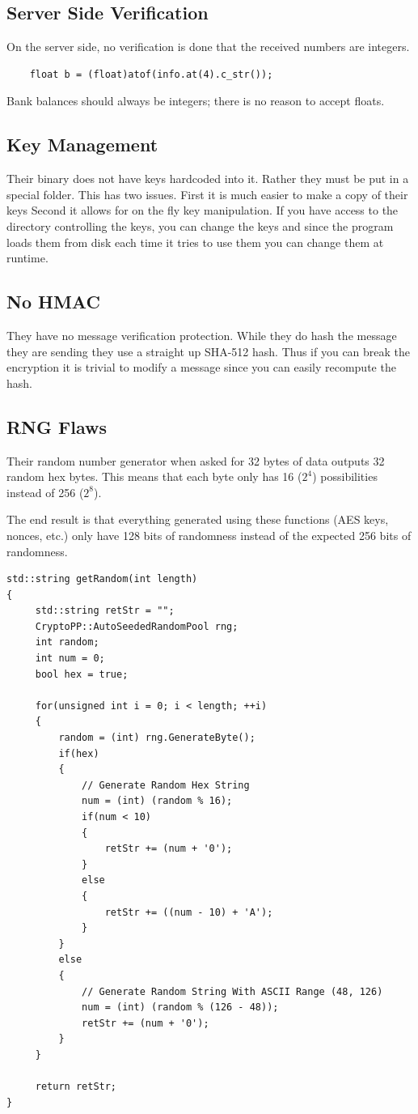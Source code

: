 \documentclass{article}
\begin{document}
\subsection{Server Side Verification}
On the server side, no verification is done that the received numbers are integers.
\begin{lstlisting}
    float b = (float)atof(info.at(4).c_str());
\end{lstlisting}
Bank balances should always be integers; there is no reason to accept floats.

\subsection{Key Management}

Their binary does not have keys hardcoded into it. Rather they must be put in a special folder. This has two issues. First it is much easier to make a copy of their keys
Second it allows for on the fly key manipulation. If you have access to the directory controlling the keys, you can change the keys and since the program loads them from disk each time it tries to use them you can change them at runtime.

\subsection{No HMAC}
They have no message verification protection.
While they do hash the message they are sending they use a straight up SHA-512 hash.
Thus if you can break the encryption it is trivial to modify a message since you can easily recompute the hash.

\subsection{RNG Flaws}

Their random number generator when asked for 32 bytes of data outputs 32
random hex bytes. This means that each byte only has 16 ($2^{4}$) possibilities instead
of 256 ($2^{8}$).

The end result is that everything generated using these functions (AES keys, nonces, etc.) only
have 128 bits of randomness instead of the expected 256 bits of randomness.
\begin{lstlisting}
std::string getRandom(int length)
{
     std::string retStr = "";
     CryptoPP::AutoSeededRandomPool rng;
     int random;
     int num = 0;
     bool hex = true;

     for(unsigned int i = 0; i < length; ++i)
     {
         random = (int) rng.GenerateByte();
         if(hex)
         {
             // Generate Random Hex String
             num = (int) (random % 16);
             if(num < 10)
             {
                 retStr += (num + '0');
             }
             else
             {
                 retStr += ((num - 10) + 'A');
             }
         }
         else
         {
             // Generate Random String With ASCII Range (48, 126)
             num = (int) (random % (126 - 48));
             retStr += (num + '0');
         }
     }

     return retStr;
}
\end{lstlisting}
\end{document}
